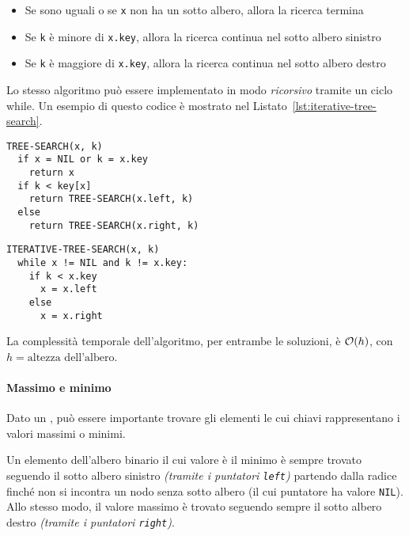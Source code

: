 \documentclass[italian, 10pt]{article}
\begin{document}
\begin{itemize}
  \item Se sono uguali o se \texttt{x} non ha un sotto albero, allora la ricerca termina
  \item Se \texttt{k} è minore di \texttt{x.key}, allora la ricerca continua nel sotto albero sinistro
  \item Se \texttt{k} è maggiore di \texttt{x.key}, allora la ricerca continua nel sotto albero destro
\end{itemize}

\bigskip
Lo stesso algoritmo può essere implementato in modo \textit{ricorsivo} tramite un ciclo while.
Un esempio di questo codice è mostrato nel Listato~\ref{lst:iterative-tree-search}.

\begin{minipage}[t]{0.495\textwidth}
  \bigskip
  \begin{lstlisting}[style=pseudocode, caption={Ricerca di un nodo in un \BST}, label={lst:tree-search}]
TREE-SEARCH(x, k)
  if x = NIL or k = x.key
    return x
  if k < key[x]
    return TREE-SEARCH(x.left, k)
  else
    return TREE-SEARCH(x.right, k)
  \end{lstlisting}
  \bigskip
\end{minipage}
\begin{minipage}[t]{0.495\textwidth}
  \bigskip
  \begin{lstlisting}[style=pseudocode, caption={Ricerca iterativa di un nodo in un BST}, label={lst:iterative-tree-search}]
ITERATIVE-TREE-SEARCH(x, k)
  while x != NIL and k != x.key:
    if k < x.key
      x = x.left
    else
      x = x.right
\end{lstlisting}
  \bigskip
\end{minipage}

La complessità temporale dell'algoritmo, per entrambe le soluzioni, è \(\mathcal{O}(h)\), con \(h = \text{altezza dell'albero}\).

\paragraph{Massimo e minimo}
\label{par:massimo-minimo-bst}

Dato un \BST, può essere importante trovare gli elementi le cui chiavi rappresentano i valori massimi o minimi.

Un elemento dell'albero binario il cui valore è il minimo è sempre trovato seguendo il sotto albero sinistro \textit{(tramite i puntatori \texttt{left})} partendo dalla radice finché non si incontra un nodo senza sotto albero (il cui puntatore ha valore \texttt{NIL}).
Allo stesso modo, il valore massimo è trovato seguendo sempre il sotto albero destro \textit{(tramite i puntatori \texttt{right})}.
\end{document}
